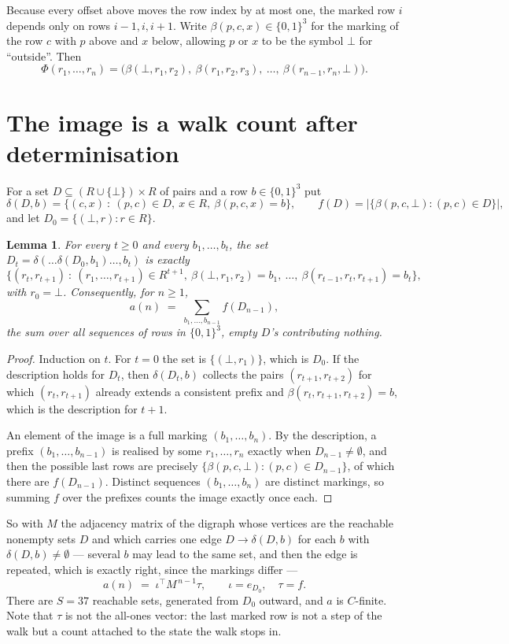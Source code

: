 \documentclass[11pt,a4paper]{article}
\theoremstyle{plain}
\newtheorem{lemma}[theorem]{Lemma}
\theoremstyle{definition}
\begin{document}
Because every offset above moves the row index by at most one, the marked row $i$ depends only
on rows $i-1,i,i+1$. Write $\beta(p,c,x)\in\{0,1\}^{3}$ for the marking of the row $c$
with $p$ above and $x$ below, allowing $p$ or $x$ to be the symbol $\bot$ for ``outside''.
Then
\[
\Phi(r_1,\dots,r_n)=\bigl(\beta(\bot,r_1,r_2),\ \beta(r_1,r_2,r_3),\ \dots,\
\beta(r_{n-1},r_n,\bot)\bigr).
\]

\section{The image is a walk count after determinisation}

For a set $D\subseteq(R\cup\{\bot\})\times R$ of pairs and a row $b\in\{0,1\}^{3}$ put
\[
\delta(D,b)=\{(c,x)\ :\ (p,c)\in D,\ x\in R,\ \beta(p,c,x)=b\},\qquad
f(D)=\bigl|\{\beta(p,c,\bot):(p,c)\in D\}\bigr| ,
\]
and let $D_0=\{(\bot,r):r\in R\}$.

\begin{lemma}\label{lem:det}
For every $t\ge0$ and every $b_1,\dots,b_t$, the set
$D_t=\delta(\dots\delta(D_0,b_1)\dots,b_t)$ is exactly
\[
\{(r_t,r_{t+1})\ :\ (r_1,\dots,r_{t+1})\in R^{t+1},\ \beta(\bot,r_1,r_2)=b_1,\ \dots,\
\beta(r_{t-1},r_t,r_{t+1})=b_t\} ,
\]
with $r_0=\bot$. Consequently, for $n\ge1$,
\[
a(n)\;=\;\sum_{b_1,\dots,b_{n-1}}f(D_{n-1}),
\]
the sum over all sequences of rows in $\{0,1\}^{3}$, empty $D$'s contributing nothing.
\end{lemma}

\begin{proof}
Induction on $t$. For $t=0$ the set is $\{(\bot,r_1)\}$, which is $D_0$. If the description
holds for $D_t$, then $\delta(D_t,b)$ collects the pairs $(r_{t+1},r_{t+2})$ for which
$(r_t,r_{t+1})$ already extends a consistent prefix and
$\beta(r_t,r_{t+1},r_{t+2})=b$, which is the description for $t+1$.

An element of the image is a full marking $(b_1,\dots,b_n)$. By the description, a prefix
$(b_1,\dots,b_{n-1})$ is realised by some $r_1,\dots,r_n$ exactly when $D_{n-1}\neq
\emptyset$, and then the possible last rows are precisely
$\{\beta(p,c,\bot):(p,c)\in D_{n-1}\}$, of which there are $f(D_{n-1})$. Distinct
sequences $(b_1,\dots,b_n)$ are distinct markings, so summing $f$ over the prefixes counts the
image exactly once each.
\end{proof}

So with $M$ the adjacency matrix of the digraph whose vertices are the reachable nonempty sets
$D$ and which carries one edge $D\to\delta(D,b)$ for each $b$ with $\delta(D,b)\neq\emptyset$
--- several $b$ may lead to the same set, and then the edge is repeated, which is exactly
right, since the markings differ ---
\[
a(n)\;=\;\iota^{\!\top}M^{\,n-1}\tau,\qquad \iota=e_{D_0},\quad \tau=f .
\]
There are $S=37$ reachable sets, generated from $D_0$ outward, and $a$ is $C$-finite. Note
that $\tau$ is not the all-ones vector: the last marked row is not a step of the walk but a
count attached to the state the walk stops in.
\end{document}
